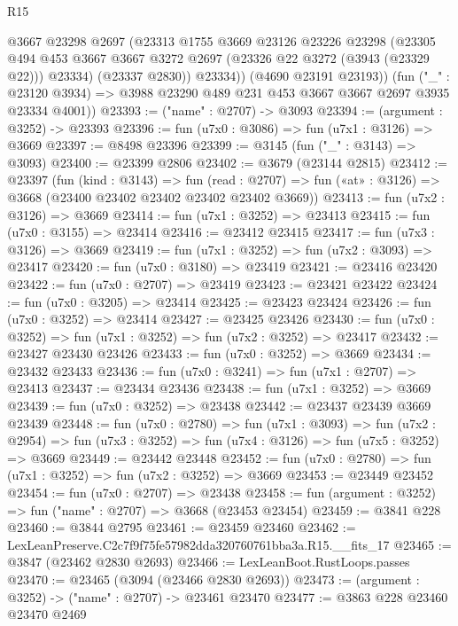 \begin{lexlean}{R15}
\begin{coremodule}
            @3667
            @23298
            @2697
            (@23313
              @1755
              @3669
              @23126
              @23226
              @23298
              (@23305
                @494
                @453
                @3667
                @3667
                @3272
                @2697
                (@23326 @22 @3272 (@3943 (@23329 @22)))
                @23334)
              (@23337 @2830))
            @23334))
        (@4690 @23191 @23193))
      (fun ("_" : @23120 @3934) =>
      @3988 @23290 @489 @231 @453 @3667 @3667 @2697 @3935 @23334 @4001))
@23393 := ("name" : @2707) -> @3093
@23394 := (argument : @3252) -> @23393
@23396 := fun (u7x0 : @3086) => fun (u7x1 : @3126) => @3669
@23397 := @8498 @23396
@23399 := @3145 (fun ("_" : @3143) => @3093)
@23400 := @23399 @2806
@23402 := @3679 (@23144 @2815)
@23412 := @23397
    (fun (kind : @3143) =>
    fun (read : @2707) => fun («at» : @3126) => @3668 (@23400 @23402 @23402 @23402 @23402 @3669))
@23413 := fun (u7x2 : @3126) => @3669
@23414 := fun (u7x1 : @3252) => @23413
@23415 := fun (u7x0 : @3155) => @23414
@23416 := @23412 @23415
@23417 := fun (u7x3 : @3126) => @3669
@23419 := fun (u7x1 : @3252) => fun (u7x2 : @3093) => @23417
@23420 := fun (u7x0 : @3180) => @23419
@23421 := @23416 @23420
@23422 := fun (u7x0 : @2707) => @23419
@23423 := @23421 @23422
@23424 := fun (u7x0 : @3205) => @23414
@23425 := @23423 @23424
@23426 := fun (u7x0 : @3252) => @23414
@23427 := @23425 @23426
@23430 := fun (u7x0 : @3252) => fun (u7x1 : @3252) => fun (u7x2 : @3252) => @23417
@23432 := @23427 @23430 @23426
@23433 := fun (u7x0 : @3252) => @3669
@23434 := @23432 @23433
@23436 := fun (u7x0 : @3241) => fun (u7x1 : @2707) => @23413
@23437 := @23434 @23436
@23438 := fun (u7x1 : @3252) => @3669
@23439 := fun (u7x0 : @3252) => @23438
@23442 := @23437 @23439 @3669 @23439
@23448 := fun (u7x0 : @2780) =>
  fun (u7x1 : @3093) =>
  fun (u7x2 : @2954) => fun (u7x3 : @3252) => fun (u7x4 : @3126) => fun (u7x5 : @3252) => @3669
@23449 := @23442 @23448
@23452 := fun (u7x0 : @2780) => fun (u7x1 : @3252) => fun (u7x2 : @3252) => @3669
@23453 := @23449 @23452
@23454 := fun (u7x0 : @2707) => @23438
@23458 := fun (argument : @3252) => fun ("name" : @2707) => @3668 (@23453 @23454)
@23459 := @3841 @228
@23460 := @3844 @2795
@23461 := @23459 @23460
@23462 := LexLeanPreserve.C2c7f9f75fe57982dda320760761bba3a.R15.__fits_17
@23465 := @3847 (@23462 @2830 @2693)
@23466 := LexLeanBoot.RustLoops.passes
@23470 := @23465 (@3094 (@23466 @2830 @2693))
@23473 := (argument : @3252) -> ("name" : @2707) -> @23461 @23470
@23477 := @3863 @228 @23460 @23470 @2469

\end{coremodule}
\end{lexlean}
